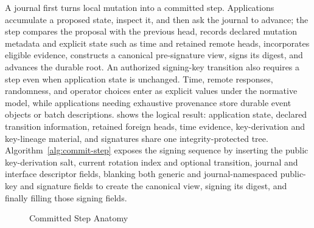 A journal first turns local mutation into a committed step. Applications accumulate a proposed state, inspect it, and then ask the journal to advance; the step compares the proposal with the previous head, records declared mutation metadata and explicit state such as time and retained remote heads, incorporates eligible evidence, constructs a canonical pre-signature view, signs its digest, and advances the durable root. An authorized signing-key transition also requires a step even when application state is unchanged. Time, remote responses, randomness, and operator choices enter as explicit values under the normative model, while applications needing exhaustive provenance store durable event objects or batch descriptions.  shows the logical result: application state, declared transition information, retained foreign heads, time evidence, key-derivation and key-lineage material, and signatures share one integrity-protected tree. Algorithm~\ref{alg:commit-step} exposes the signing sequence by inserting the public key-derivation salt, current rotation index and optional transition, journal and interface descriptor fields, blanking both generic and journal-namespaced public-key and signature fields to create the canonical view, signing its digest, and finally filling those signing fields.

\begin{figure}[htbp]
  \centering
  \resizebox{0.96\textwidth}{!}{}
  \caption{Committed Step Anatomy}
  \label{fig:step-anatomy}
\end{figure}



